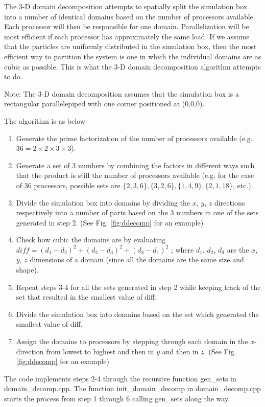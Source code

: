 \documentclass[10pt]{article}
\begin{document}
The 3-D domain decomposition attempts to spatially split the simulation box into a number of
identical domains based on the number of processors available. Each processor will then be responsible
for one domain. Parallelization will be most efficient if each processor has approximately the same load.
If we assume that the particles are uniformly distributed in the simulation box, then the most efficient
way to partition the system is one in which the individual domains are as cubic as possible. This is what
the 3-D domain decomposition algorithm attempts to do.

Note: The 3-D domain decomposition assumes that the simulation box is a rectangular parallelepiped
with one corner positioned at (0,0,0).

The algorithm is as below
\begin{enumerate}
\item Generate the prime factorization of the number of processors available (e.g. $36 = 2 \times 2 \times 3 \times 3$).
\item Generate a set of 3 numbers by combining the factors in different ways such that the product
is still the number of processors available (e.g. for the case of 36 processors, possible sets are
$\{2,3,6\}, \{3,2,6\}, \{1,4,9\}, \{2, 1, 18\}$, etc.).
\item Divide the simulation box into domains by dividing the $x$, $y$, $z$ directions respectively into a
number of parts based on the 3 numbers in one of the sets generated in step 2. (See Fig. \ref{fig:ddecomp} for an
example)
\item Check how cubic the domains are by evaluating $diff = (d_1-d_2)^2+(d_2-d_3)^2+(d_3-d_1)^2$ ; where $d_1$, $d_2$, $d_3$
are the $x$, $y$, $z$ dimensions of a domain (since all the domains are the same size and shape).
\item Repeat steps 3-4 for all the sets generated in step 2 while keeping track of the set that resulted
in the smallest value of diff.
\item Divide the simulation box into domains based on the set which generated the smallest value of
diff.
\item Assign the domains to processors by stepping through each domain in the $x$-direction from
lowest to highest and then in $y$ and then in $z$. (See Fig. \ref{fig:ddecomp} for an example)
\end{enumerate}

The code implements steps 2-4 through the recursive function gen\_sets in domain\_decomp.cpp.
The function init\_domain\_decomp in domain\_decomp.cpp starts the process from step 1 through 6
calling gen\_sets along the way.
\end{document}
